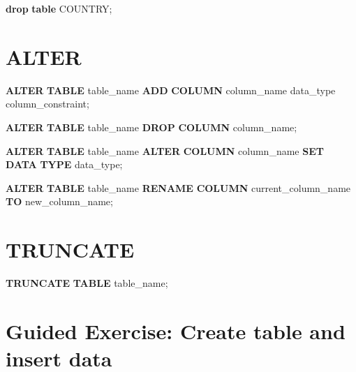 \documentclass[
]{book}
\newenvironment{Shaded}{\begin{snugshade}}{\end{snugshade}}
\newcommand{\KeywordTok}[1]{\textcolor[rgb]{0.13,0.29,0.53}{\textbf{#1}}}
\newcommand{\NormalTok}[1]{#1}
\begin{document}
\begin{Shaded}
\begin{Highlighting}[]
\KeywordTok{drop} \KeywordTok{table}\NormalTok{ COUNTRY;}
\end{Highlighting}
\end{Shaded}

\hypertarget{alter}{%
\section{ALTER}\label{alter}}

\begin{Shaded}
\begin{Highlighting}[]
\KeywordTok{ALTER} \KeywordTok{TABLE}\NormalTok{ table\_name}
\KeywordTok{ADD} \KeywordTok{COLUMN}\NormalTok{ column\_name data\_type column\_constraint;}

\KeywordTok{ALTER} \KeywordTok{TABLE}\NormalTok{ table\_name}
\KeywordTok{DROP} \KeywordTok{COLUMN}\NormalTok{ column\_name;}

\KeywordTok{ALTER} \KeywordTok{TABLE}\NormalTok{ table\_name}
\KeywordTok{ALTER} \KeywordTok{COLUMN}\NormalTok{ column\_name }\KeywordTok{SET} \KeywordTok{DATA} \KeywordTok{TYPE}\NormalTok{ data\_type;}

\KeywordTok{ALTER} \KeywordTok{TABLE}\NormalTok{ table\_name}
\KeywordTok{RENAME} \KeywordTok{COLUMN}\NormalTok{ current\_column\_name }\KeywordTok{TO}\NormalTok{ new\_column\_name;}
\end{Highlighting}
\end{Shaded}

\hypertarget{truncate}{%
\section{TRUNCATE}\label{truncate}}

\begin{Shaded}
\begin{Highlighting}[]
\KeywordTok{TRUNCATE} \KeywordTok{TABLE}\NormalTok{ table\_name;}
\end{Highlighting}
\end{Shaded}

\hypertarget{guided-exercise-create-table-and-insert-data}{%
\section{Guided Exercise: Create table and insert data}\label{guided-exercise-create-table-and-insert-data}}
\end{document}

